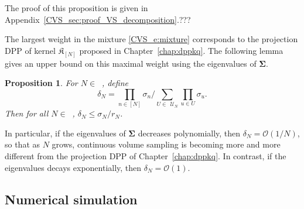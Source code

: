 \documentclass[twoside,11pt]{book}
\newtheorem{proposition}{Proposition}
\numberwithin{theorem}{chapter}
\numberwithin{definition}{chapter}
\numberwithin{proposition}{chapter}
\numberwithin{corollary}{chapter}
\numberwithin{example}{chapter}
\numberwithin{lemma}{chapter}
\numberwithin{assumption}{chapter}
\numberwithin{equation}{chapter}
\numberwithin{figure}{chapter}
\DeclareMathOperator*{\KDPP}{\mathfrak{K}}
\DeclareMathOperator{\Ns}{\mathbb{N}^{*}}
\def\UN{\:\mathcal{U}_N}
\begin{document}
The proof of this proposition is given in Appendix~\ref{CVS_sec:proof_VS_decomposition}.???

The largest weight in the mixture \eqref{CVS_e:mixture} corresponds to the projection DPP of kernel $\mathfrak{K}_{[N]}$ proposed in Chapter~\ref{chap:dppkq}. The following lemma gives an upper bound on this maximal weight using the eigenvalues of $\bm{\Sigma}$.
\begin{proposition}\label{CVS_lemma:projection_DPP_weight}
For $N \in \Ns$, define
\begin{equation}
\delta_{N} = \prod\limits_{n \in [N]} \sigma_{n} \bigg/\sum\limits_{ U \in \: \UN} \prod\limits_{u \in U} \sigma_{u}.
\end{equation}
Then for all $N \in \Ns$, $\displaystyle \delta_{N} \leq \sigma_{N} / r_{N}$.
\end{proposition}
In particular, if the eigenvalues of $\bm{\Sigma}$ decreases polynomially, then $\delta_{N} = \mathcal{O}(1/N)$, so that as $N$ grows, continuous volume sampling is becoming more and more different from the projection DPP of Chapter~\ref{chap:dppkq}. In contrast, if the eigenvalues decays exponentially, then $\delta_{N} = \mathcal{O}(1)$.

\subsection{Numerical simulation}

\end{document}
